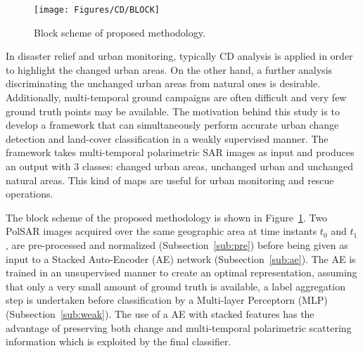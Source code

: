 \begin{figure}[tbhp]
\centering
\texttt{[image: Figures/CD/BLOCK]}
\caption{Block scheme of proposed methodology.}
\label{fig:1_method}
\end{figure}

\label{sec:Method}
In disaster relief and urban monitoring, typically CD analysis is applied in order to highlight the changed urban areas. On the other hand, a further analysis discriminating the unchanged urban areas from natural ones is desirable. Additionally, multi-temporal ground campaigns are often difficult and very few ground truth points may be available.   
The motivation behind this study is to develop a framework that can simultaneously perform accurate urban change detection and land-cover classification in a weakly supervised manner. The framework takes multi-temporal polarimetric SAR images as input and produces an output with 3 classes: changed urban areas, unchanged urban and unchanged natural areas. This kind of maps are useful for urban monitoring and rescue operations. %

The  block scheme of the proposed methodology is shown in Figure~\ref{fig:1_method}. Two PolSAR images  acquired over the same geographic area at time instants $t_0$ and $t_1$,  are pre-processed and normalized  (Subsection~\ref{sub:pre})  before being given as input to a Stacked Auto-Encoder (AE) network (Subsection~\ref{sub:ae}). The AE is trained in an unsupervised manner to create an optimal representation, assuming that only a very small amount of ground truth is available, a label aggregation step is undertaken before classification by a Multi-layer Perceptorn (MLP) (Subsection~\ref{sub:weak}). 
The use of a AE with stacked features has the advantage of preserving both change and multi-temporal polarimetric scattering information which is exploited by the final classifier. %


